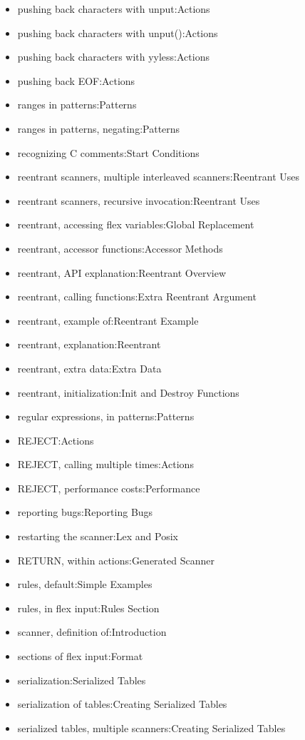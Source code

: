 \documentclass[openany,oneside]{book}
\begin{document}
\begin{itemize}
\item pushing back characters with unput:Actions
\item pushing back characters with unput():Actions
\item pushing back characters with yyless:Actions
\item pushing back EOF:Actions
\item ranges in patterns:Patterns
\item ranges in patterns, negating:Patterns
\item recognizing C comments:Start Conditions
\item reentrant scanners, multiple interleaved scanners:Reentrant Uses
\item reentrant scanners, recursive invocation:Reentrant Uses
\item reentrant, accessing flex variables:Global Replacement
\item reentrant, accessor functions:Accessor Methods
\item reentrant, API explanation:Reentrant Overview
\item reentrant, calling functions:Extra Reentrant Argument
\item reentrant, example of:Reentrant Example
\item reentrant, explanation:Reentrant
\item reentrant, extra data:Extra Data
\item reentrant, initialization:Init and Destroy Functions
\item regular expressions, in patterns:Patterns
\item REJECT:Actions
\item REJECT, calling multiple times:Actions
\item REJECT, performance costs:Performance
\item reporting bugs:Reporting Bugs
\item restarting the scanner:Lex and Posix
\item RETURN, within actions:Generated Scanner
\item rules, default:Simple Examples
\item rules, in flex input:Rules Section
\item scanner, definition of:Introduction
\item sections of flex input:Format
\item serialization:Serialized Tables
\item serialization of tables:Creating Serialized Tables
\item serialized tables, multiple scanners:Creating Serialized Tables

\end{itemize}
\end{document}
